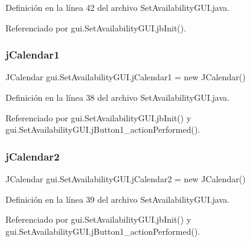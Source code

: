 Definición en la línea 42 del archivo Set\+Availability\+G\+U\+I.\+java.



Referenciado por gui.\+Set\+Availability\+G\+U\+I.\+jb\+Init().

\mbox{\label{classgui_1_1_set_availability_g_u_i_a63c6223a835c93552a03023371a639c1}} 
\subsubsection{\texorpdfstring{jCalendar1}{jCalendar1}}
{\footnotesize\ttfamily J\+Calendar gui.\+Set\+Availability\+G\+U\+I.\+j\+Calendar1 = new J\+Calendar()\hspace{0.3cm}{\ttfamily [private]}}



Definición en la línea 38 del archivo Set\+Availability\+G\+U\+I.\+java.



Referenciado por gui.\+Set\+Availability\+G\+U\+I.\+jb\+Init() y gui.\+Set\+Availability\+G\+U\+I.\+j\+Button1\+\_\+action\+Performed().

\mbox{\label{classgui_1_1_set_availability_g_u_i_adb69766fbc914bb6e0fd934557e3e291}} 
\subsubsection{\texorpdfstring{jCalendar2}{jCalendar2}}
{\footnotesize\ttfamily J\+Calendar gui.\+Set\+Availability\+G\+U\+I.\+j\+Calendar2 = new J\+Calendar()\hspace{0.3cm}{\ttfamily [private]}}



Definición en la línea 39 del archivo Set\+Availability\+G\+U\+I.\+java.



Referenciado por gui.\+Set\+Availability\+G\+U\+I.\+jb\+Init() y gui.\+Set\+Availability\+G\+U\+I.\+j\+Button1\+\_\+action\+Performed().

\mbox{\label{classgui_1_1_set_availability_g_u_i_a759205843282f8c868c459aa46c17e33}} 
